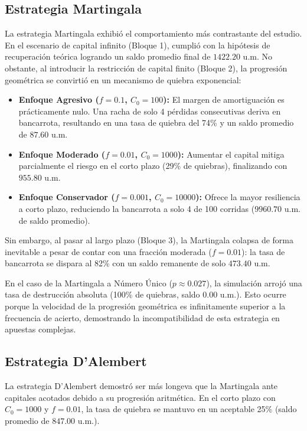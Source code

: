 \documentclass{article}
\begin{document}
\subsection{Estrategia Martingala}
    La estrategia Martingala exhibió el comportamiento más contrastante del estudio. En el escenario de capital infinito (Bloque 1), cumplió con la hipótesis de recuperación teórica logrando un saldo promedio final de $1422.20$ u.m. No obstante, al introducir la restricción de capital finito (Bloque 2), la progresión geométrica se convirtió en un mecanismo de quiebra exponencial:
\begin{itemize}
    \item \textbf{Enfoque Agresivo ($f = 0.1$, $C_0 = 100$):} El margen de amortiguación es prácticamente nulo. Una racha de solo 4 pérdidas consecutivas deriva en bancarrota, resultando en una tasa de quiebra del 74\% y un saldo promedio de $87.60$ u.m.
    \item \textbf{Enfoque Moderado ($f = 0.01$, $C_0 = 1000$):} Aumentar el capital mitiga parcialmente el riesgo en el corto plazo (29\% de quiebras), finalizando con $955.80$ u.m.
    \item \textbf{Enfoque Conservador ($f = 0.001$, $C_0 = 10000$):} Ofrece la mayor resiliencia a corto plazo, reduciendo la bancarrota a solo 4 de 100 corridas ($9960.70$ u.m. de saldo promedio).
\end{itemize}
Sin embargo, al pasar al largo plazo (Bloque 3), la Martingala colapsa de forma inevitable a pesar de contar con una fracción moderada ($f = 0.01$): la tasa de bancarrota se dispara al 82\% con un saldo remanente de solo $473.40$ u.m. 

En el caso de la Martingala a Número Único ($p \approx 0.027$), la simulación arrojó una tasa de destrucción absoluta (100\% de quiebras, saldo $0.00$ u.m.). Esto ocurre porque la velocidad de la progresión geométrica es infinitamente superior a la frecuencia de acierto, demostrando la incompatibilidad de esta estrategia en apuestas complejas.

\subsection{Estrategia D'Alembert}
La estrategia D'Alembert demostró ser más longeva que la Martingala ante capitales acotados debido a su progresión aritmética. En el corto plazo con $C_0 = 1000$ y $f=0.01$, la tasa de quiebra se mantuvo en un aceptable 25\% (saldo promedio de $847.00$ u.m.). 
\end{document}
